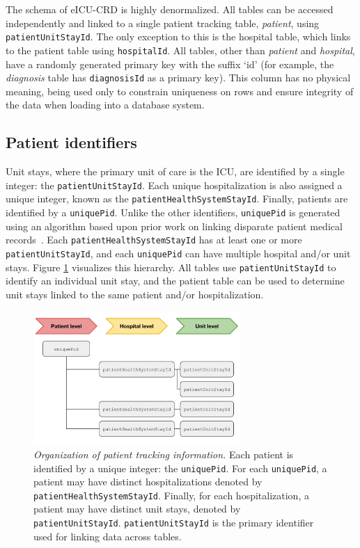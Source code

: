 \documentclass[english]{article}
\newcommand{\colname}[1]{\texttt{#1}}
\newcommand{\tblname}[1]{\emph{#1}}
\begin{document}
The schema of eICU-CRD is highly denormalized. All tables can be accessed independently and linked to a single patient tracking table, \tblname{patient}, using \colname{patientUnitStayId}. The only exception to this is the hospital table, which links to the patient table using \colname{hospitalId}. All tables, other than \tblname{patient} and \tblname{hospital}, have a randomly generated primary key with the suffix `id' (for example, the \tblname{diagnosis} table has \colname{diagnosisId} as a primary key). This column has no physical meaning, being used only to constrain uniqueness on rows and ensure integrity of the data when loading into a database system.

\subsection*{Patient identifiers}\label{patient-identifiers}

Unit stays, where the primary unit of care is the ICU, are identified by a single integer: the \colname{patientUnitStayId}. Each unique hospitalization is also assigned a unique integer, known as the \colname{patientHealthSystemStayId}. Finally, patients are identified by a \colname{uniquePid}. Unlike the other identifiers, \colname{uniquePid} is generated using an algorithm based upon prior work on linking disparate patient medical records~\cite{finney2011efficient}.
Each \colname{patientHealthSystemStayId} has at least one or more \colname{patientUnitStayId}, and each \colname{uniquePid} can have multiple hospital and/or unit stays. Figure \ref{fig:patient_organization} visualizes this hierarchy. All tables use
\colname{patientUnitStayId} to identify an individual unit stay, and the patient table can be used to determine unit stays linked to the same patient and/or hospitalization.

\begin{figure}[htbp]
\centering
\includegraphics[width=0.70000\textwidth]{img/Patient_Organization}
\caption{\emph{Organization of patient tracking information.} Each patient is identified by a unique integer: the \colname{uniquePid}. For each \colname{uniquePid}, a patient may have distinct hospitalizations denoted by \colname{patientHealthSystemStayId}. Finally, for each hospitalization, a patient may have distinct unit stays, denoted by \colname{patientUnitStayId}. \colname{patientUnitStayId} is the primary identifier used for linking data across tables. \label{fig:patient_organization}}
\end{figure}
\end{document}
